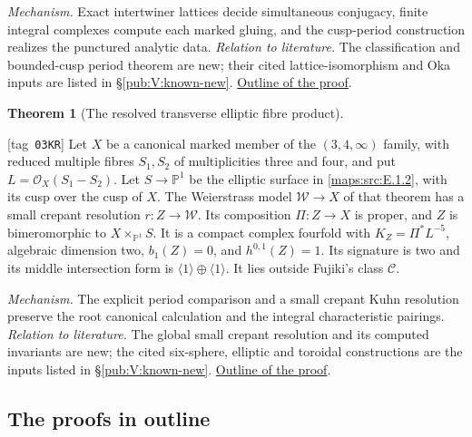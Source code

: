 \documentclass[11pt,a4paper]{article}
\numberwithin{equation}{section}
\theoremstyle{definition}
\newtheorem{maintheorem}{Theorem}
\newcommand{\StatementRecord}[4]{{\upshape\footnotesize[tag~\texttt{#3}]}\enspace\ignorespaces}
\begin{document}
\textit{Mechanism.} Exact intertwiner lattices decide simultaneous conjugacy, finite integral complexes compute each marked gluing, and the cusp-period construction realizes the punctured analytic data.
\textit{Relation to literature.} The classification and bounded-cusp period theorem are new; their cited lattice-isomorphism and Oka inputs are listed in \S\ref{pub:V:known-new}.
\hyperlink{outline-V-F}{Outline of the proof}.


\hypertarget{main-V-A}{}
\begin{maintheorem}[The resolved transverse elliptic fibre product]
\hypertarget{tag-03KR}{}\label{series:V:A}
\StatementRecord{series:V:A}{proved}{03KR}{\cref{maps:src:E.1.2}, \cref{maps:src:E.2.1}}
Let $X$ be a canonical marked member of the $(3,4,\infty)$
family, with reduced multiple fibres $S_1,S_2$ of multiplicities
three and four, and put $L=\mathcal O_X(S_1-S_2)$.
Let $S\to\mathbb P^1$ be the elliptic surface in
\cref{maps:src:E.1.2}, with its cusp over the cusp of $X$.
The Weierstrass model $\mathscr W\to X$ of that theorem has a
small crepant resolution $r:Z\to\mathscr W$.
Its composition $\Pi:Z\to X$ is proper, and $Z$ is
bimeromorphic to $X\times_{\mathbb P^1}S$.
It is a compact complex fourfold with
$K_Z=\Pi^*L^{-5}$, algebraic dimension two,
$b_1(Z)=0$, and $h^{0,1}(Z)=1$.
Its signature is two and its middle intersection form is
$\langle1\rangle\oplus\langle1\rangle$.
It lies outside Fujiki's class $\mathcal C$.
\end{maintheorem}

\textit{Mechanism.} The explicit period comparison and a small crepant Kuhn resolution preserve the root canonical calculation and the integral characteristic pairings.
\textit{Relation to literature.} The global small crepant resolution and its computed invariants are new; the cited six-sphere, elliptic and toroidal constructions are the inputs listed in \S\ref{pub:V:known-new}.
\hyperlink{outline-V-A}{Outline of the proof}.

\subsection{The proofs in outline}
\hypertarget{outline-V-D}{}
\end{document}
